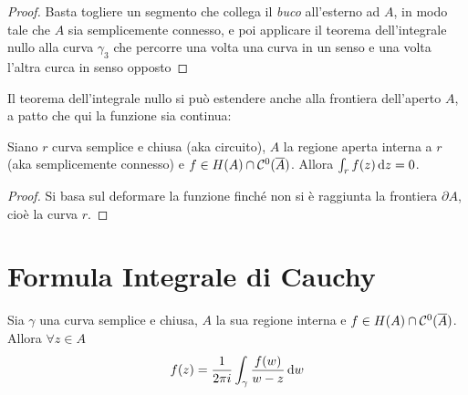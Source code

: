 
\begin{proof}
Basta togliere un segmento che collega il \textit{buco} all'esterno ad $A$, in modo tale che $A$ sia semplicemente connesso, e poi applicare il teorema dell'integrale nullo alla curva $\gamma_3$ che percorre una volta una curva in un senso e una volta l'altra curca in senso opposto
\end{proof}

Il teorema dell'integrale nullo si può estendere anche alla frontiera dell'aperto $A$, a patto che qui la funzione sia continua:
\begin{thm}
Siano $r$ curva semplice e chiusa (aka circuito), $A$ la regione aperta interna a $r$ (aka semplicemente connesso) e $f\in H(A)\cap\mathcal{C}^0(\overline{A})$. Allora $\int_r f(z)\, \mathrm{d} z=0$.
\end{thm}
\begin{proof}
Si basa sul deformare la funzione finché non si è raggiunta la frontiera $\partial A$, cioè la curva $r$.
\end{proof}

\section{Formula Integrale di Cauchy}

\begin{thm}
Sia $\gamma$ una curva semplice e chiusa, $A$ la sua regione interna e $f\in H(A) \cap \mathcal{C}^{0}(\overline{A})$. Allora $\forall z\in A$
\begin{equation*}
f(z) = \frac{1}{2\pi i}\int_{\gamma}\frac{f(w)}{w - z} \, \mathrm{d} w
\end{equation*}
\end{thm}

